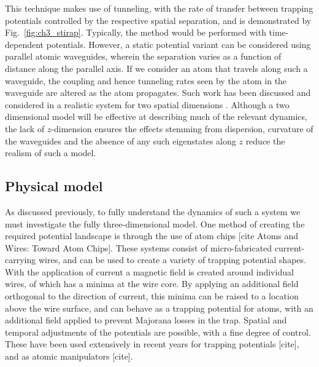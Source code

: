 This technique makes use of tunneling, with the rate of transfer between trapping potentials controlled by the respective spatial separation, and is demonstrated by Fig.~\ref{fig:ch3_stirap}. Typically, the method would be performed with time-dependent potentials. However, a static potential variant can be considered using parallel atomic waveguides, wherein the separation varies as a function of distance along the parallel axis. If we consider an atom that travels along such a waveguide, the coupling and hence tunneling rates seen by the atom in the waveguide are altered as the atom propagates. Such work has been discussed and considered in a realistic system for two spatial dimensions \cite{OSullivan:10}. Although a two dimensional model will be effective at describing much of the relevant dynamics, the lack of $z$-dimension ensures the effects stemming from dispersion, curvature of the waveguides and the absence of any such eigenstates along $z$ reduce the realism of such a model.

\subsection{Physical model}

As discussed previously, to fully understand the dynamics of such a system we must investigate the fully three-dimensional model. One method of creating the required potential landscape is through the use of atom chips \cite{Bartenstein_ieee_2000}[cite Atoms and Wires: Toward Atom Chips]. These systems consist of micro-fabricated current-carrying wires, and can be used to create a variety of trapping potential shapes. With the application of current a magnetic field is created around individual wires, of which has a minima at the wire core. By applying an additional field orthogonal to the direction of current, this minima can be raised to a location above the wire surface, and can behave as a trapping potential for atoms, with an additional field applied to prevent Majorana losses in the trap. Spatial and temporal adjustments of the potentials are possible, with a fine degree of control. These have been used extensively in recent years for trapping potentials [cite], and as atomic manipulators [cite].

